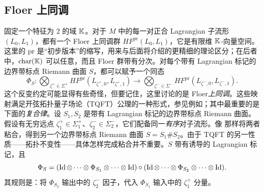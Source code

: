\subsection{Floer 上同调}\label{sec:8b}
固定一个特征为 $2$ 的域 $\mathbb K$。对于 $M$ 中的每一对正合 Lagrangian 子流形 $(L_0,L_1)$，都有一个 Floer 上同调群 $HF^{\mathrm{pr}}(L_0,L_1)$，它是有限维 $\mathbb K$-向量空间。这里的 $\mathrm{pr}$ 是“初步版本”的缩写，用来与后面将介绍的更精细的理论区分；在后者中，$\operatorname{char}(\mathbb K)$ 可以任意，而且 Floer 群带有分次。对每个带有 Lagrangian 标记的边界带标点 Riemann 曲面 $S$，都可以赋予一个同态
\begin{equation}\label{eq:8.1}
\Phi_S:\bigotimes_{\zeta^+\in\Sigma^+}HF^{\mathrm{pr}}(L_{\zeta^+,0},L_{\zeta^+,1})
\longrightarrow\bigotimes_{\zeta^-\in\Sigma^-}HF^{\mathrm{pr}}(L_{\zeta^-,0},L_{\zeta^-,1}).
\end{equation}
这个反变约定可能显得有些奇怪，但要记住，这里讨论的是 Floer\emph{上同调}。这些映射满足开弦拓扑量子场论（TQFT）公理的一种形式，参见例如；其中最重要的是下面的\emph{复合律}。设 $S_1,S_2$ 是带有 Lagrangian 标记的边界带标点 Riemann 曲面。假设有无穷远点 $\zeta_1^+\in\Sigma_1^+$、$\zeta_2^-\in\Sigma_2^-$，它们配备同一\emph{有序}对子流形。像 那样将两者粘合，得到另一个边界带标点 Riemann 曲面 $S=S_1\#S_2$。由于 TQFT 的另一性质——拓扑不变性——具体怎样完成粘合并不重要。$S$ 带有诱导的 Lagrangian 标记，且
\begin{equation}\label{eq:8.2}
\Phi_S=(\operatorname{Id}\otimes\cdots\otimes\Phi_{S_1}\otimes\cdots\otimes\operatorname{Id})
\circ(\operatorname{Id}\otimes\cdots\otimes\Phi_{S_2}\otimes\cdots\otimes\operatorname{Id}).
\end{equation}
其规则是：将 $\Phi_{S_2}$ 输出中的 $\zeta_2^-$ 因子，代入 $\Phi_{S_1}$ 输入中的 $\zeta_1^+$ 分量。

